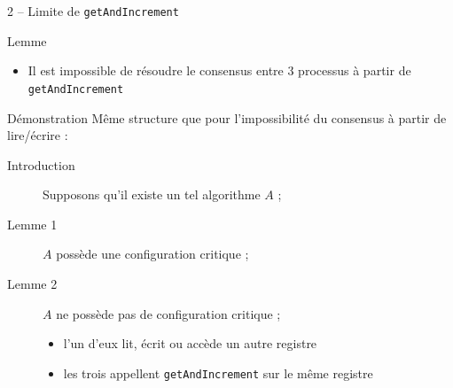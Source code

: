 
\begingroup

\begin{frame}[fragile]{2 -- Limite de \lstinline{getAndIncrement}}

    \vspace{-3mm}
  \begin{exampleblock}{Lemme}
    \begin{itemize}
    \item Il est impossible de résoudre le consensus entre 3 processus à partir de \lstinline{getAndIncrement}
    \end{itemize}
  \end{exampleblock}

    \vspace{-3mm}
  \begin{block}{Démonstration}
    Même structure que pour l'impossibilité du consensus à partir de lire/écrire : 
    \begin{description}
    \item[Introduction] Supposons qu'il existe un tel algorithme $A$ ; 
    \item[Lemme 1] $A$ possède une configuration critique ; 
    \item[Lemme 2] $A$ ne possède pas de configuration critique ; 
      \begin{itemize}
      \item l'un d'eux lit, écrit ou accède un autre registre 
      \item les trois appellent \lstinline{getAndIncrement} sur le même registre
      \end{itemize}
    \end{description}
    \vspace{-2mm}
    \begin{center}
\end{center}
\end{block}
\end{frame}
